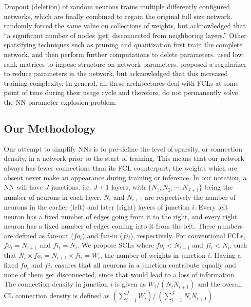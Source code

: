 \documentclass[conference]{IEEEtran}
\begin{document}
Dropout (deletion) of random neurons \cite{Srivastava2014} %
trains multiple differently configured networks, which are finally combined to regain the original full size network. \cite{Chen2015} randomly forced the same value on collections of weights, but acknowledged that ``a significant number of nodes [get] disconnected from neighboring layers.'' Other sparsifying techniques such as pruning and quantization \cite{Han2016DC,Han2015,Zhou2016,Gong2014} first train the complete network, and then perform further computations to delete parameters. \cite{Sindhwani2015} used low rank matrices to impose structure on network parameters. \cite{Srinivas2016} proposed a regularizer to reduce parameters in the network, but acknowledged that this %
increased training complexity. In general, all these architectures deal with FCLs at some point of time during their usage cycle and therefore, do not permanently solve the NN parameter explosion problem.

\subsection{Our Methodology}\label{method}
Our attempt to simplify NNs is to pre-define the level of sparsity, or connection density, in a network prior to the start of training. This means that our network always has fewer connections than its FCL counterpart; the weights which are absent never make an appearance during training or inference. In our notation, a NN will have $J$ junctions, i.e. $J+1$ layers, with $\{N_1,N_2,\cdots,N_{J+1}\}$ being the number of neurons in each layer. $N_i$ and $N_{i+1}$ are respectively the number of neurons in the earlier (left) and later (right) layers of junction $i$. Every left neuron has a fixed number of edges going from it to the right, and every right neuron has a fixed number of edges coming into it from the left. These numbers are defined as fan-out ($fo_i$) and fan-in ($fi_i$), respectively. For conventional FCLs, $fo_i = N_{i+1}$ and $fi_i = N_i$. We propose SCLs where $fo_i < N_{i+1}$ and $fi_i < N_i$, such that $N_i\times fo_i = N_{i+1}\times fi_i = W_i$, the number of weights in junction $i$. Having a fixed $fo_i$ and $fi_i$ ensures that all neurons in a junction contribute equally and none of them get disconnected, since that would lead to a loss of information. The connection density in junction $i$ is given as $W_i/(N_iN_{i+1})$ and the overall CL connection density is defined as $\left( \sum_{i=1}^{J}{W_i} \right) /\ \left( \sum_{i=1}^{J}{N_iN_{i+1}} \right )$.
\end{document}

